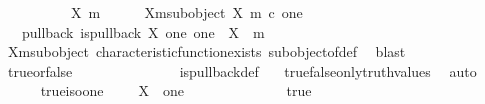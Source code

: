 \begin{isabellebody}
\ \ \isamarkupfalse%
\ {\isacharminus}{\kern0pt}\isanewline
\ \ \ \ \isamarkupfalse%
\ X\ m\isanewline
\ \ \ \ \isamarkupfalse%
\ X{\isacharunderscore}{\kern0pt}m{\isacharunderscore}{\kern0pt}subobject{\isacharcolon}{\kern0pt}\ {\isachardoublequoteopen}{\isacharparenleft}{\kern0pt}X{\isacharcomma}{\kern0pt}\ m{\isacharparenright}{\kern0pt}\ {\isasymsubseteq}\isactrlsub c\ one{\isachardoublequoteclose}\isanewline
\isanewline
\ \ \ \ \isamarkupfalse%
\ {\isasymchi}\ \ {\isasymchi}{\isacharunderscore}{\kern0pt}pullback{\isacharcolon}{\kern0pt}\ {\isachardoublequoteopen}is{\isacharunderscore}{\kern0pt}pullback\ X\ one\ one\ {\isasymOmega}\ {\isacharparenleft}{\kern0pt}{\isasymbeta}\isactrlbsub X\isactrlesub {\isacharparenright}{\kern0pt}\ {\isasymt}\ m\ {\isasymchi}{\isachardoublequoteclose}\isanewline
\ \ \ \ \ \ \isamarkupfalse%
\ X{\isacharunderscore}{\kern0pt}m{\isacharunderscore}{\kern0pt}subobject\ characteristic{\isacharunderscore}{\kern0pt}function{\isacharunderscore}{\kern0pt}exists\ subobject{\isacharunderscore}{\kern0pt}of{\isacharunderscore}{\kern0pt}def{}\ \isamarkupfalse%
\ blast\isanewline
\ \ \ \ \isamarkupfalse%
\ \isamarkupfalse%
\ {\isasymchi}{\isacharunderscore}{\kern0pt}true{\isacharunderscore}{\kern0pt}or{\isacharunderscore}{\kern0pt}false{\isacharcolon}{\kern0pt}\ {\isachardoublequoteopen}{\isasymchi}\ {\isacharequal}{\kern0pt}\ {\isasymt}\ {\isasymor}\ {\isasymchi}\ {\isacharequal}{\kern0pt}\ {\isasymf}{\isachardoublequoteclose}\isanewline
\ \ \ \ \ \ \isamarkupfalse%
\ is{\isacharunderscore}{\kern0pt}pullback{\isacharunderscore}{\kern0pt}def\ \ \isamarkupfalse%
\ true{\isacharunderscore}{\kern0pt}false{\isacharunderscore}{\kern0pt}only{\isacharunderscore}{\kern0pt}truth{\isacharunderscore}{\kern0pt}values\ \isamarkupfalse%
\ auto\isanewline
\isanewline
\ \ \ \ \isamarkupfalse%
\ true{\isacharunderscore}{\kern0pt}iso{\isacharunderscore}{\kern0pt}one{\isacharcolon}{\kern0pt}\ {\isachardoublequoteopen}{\isasymchi}\ {\isacharequal}{\kern0pt}\ {\isasymt}\ {\isasymLongrightarrow}\ X\ {\isasymcong}\ one{\isachardoublequoteclose}\isanewline
\ \ \ \ \isamarkupfalse%
\ {\isacharminus}{\kern0pt}\isanewline
\ \ \ \ \ \ \isamarkupfalse%
\ {\isasymchi}{\isacharunderscore}{\kern0pt}true{\isacharcolon}{\kern0pt}\ {\isachardoublequoteopen}{\isasymchi}\ {\isacharequal}{\kern0pt}\ {\isasymt}{\isachardoublequoteclose}\isanewline

\end{isabellebody}
